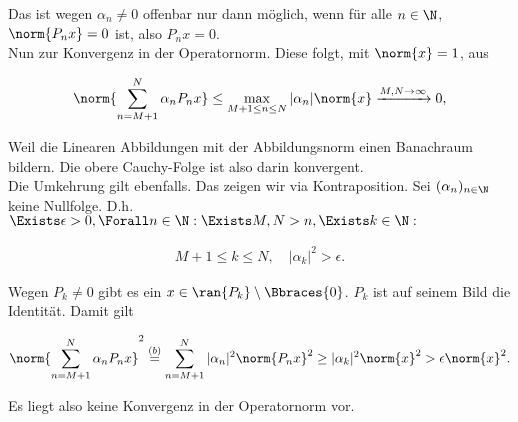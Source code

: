\begin{solution}
Das ist wegen $\alpha_n \neq 0$ offenbar nur dann möglich, wenn für alle $n \in \N$, $\norm{P_n x} = 0$ ist, also $P_n x = 0$. \\

Nun zur Konvergenz in der Operatornorm.
Diese folgt, mit $\norm{x} = 1$, aus

\begin{align*}
  \norm{\sum_{n=M+1}^N \alpha_n P_n x}
  \leq
  \max_{M+1 \leq n \leq N} |\alpha_n| \norm{x}
  \xrightarrow{M, N \to \infty} 0,
\end{align*}

Weil die Linearen Abbildungen mit der Abbildungsnorm einen Banachraum bildern.
Die obere Cauchy-Folge ist also darin konvergent. \\

Die Umkehrung gilt ebenfalls.
Das zeigen wir via Kontraposition.
Sei $(\alpha_n)_{n \in \N}$ keine Nullfolge.
D.h. $\Exists \epsilon > 0, \Forall n \in \N: \Exists M, N > n, \Exists k \in \N:$

\begin{align*}
  M+1 \leq k \leq N,
  \quad
  |\alpha_k|^2 > \epsilon.
\end{align*}

Wegen $P_k \neq 0$ gibt es ein $x \in \ran{P_k} \setminus \Bbraces{0}$.
$P_k$ ist auf seinem Bild die Identität.
Damit gilt

\begin{align*}
 \norm{\sum_{n = M+1}^N \alpha_n P_n x}^2
 \stackrel{(b)}{=}
 \sum_{n = M+1}^N |\alpha_n|^2 \norm{P_n x}^2
 \geq
 |\alpha_k|^2 \norm{x}^2
 >
 \epsilon \norm{x}^2.
\end{align*}

Es liegt also keine Konvergenz in der Operatornorm vor. \\

\end{solution}
